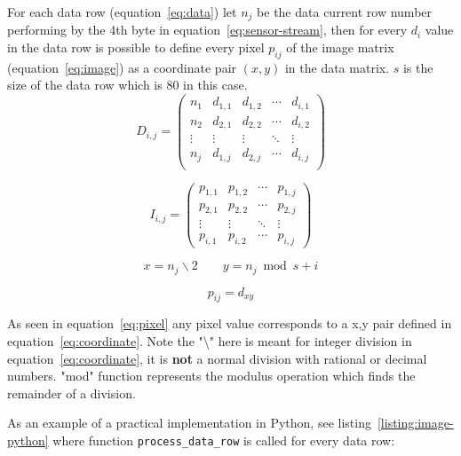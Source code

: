 \documentclass[hidelinks,11pt,a4paper,oneside,article]{memoir}
\begin{document}
For each data row (equation~\ref{eq:data}) let $n_j$ be the data current row number performing by the 4th byte in equation~\ref{eq:sensor-stream}, then for every $d_i$ value in the data row is possible to define every pixel $p_{ij}$ of the image matrix (equation~\ref{eq:image}) as a coordinate pair $(x,y)$ in the data matrix. $s$ is the size of the data row which is 80 in this case.
\begin{equation}
\label{eq:data}
D_{i,j} = 
\begin{pmatrix}
    n_1 & d_{1,1} & d_{1,2} & \cdots & d_{i,1}\\
    n_2 & d_{2,1} & d_{2,2} & \cdots & d_{i,2}\\
 \vdots & \vdots  & \vdots  & \ddots & \vdots  \\
    n_j & d_{1,j} & d_{2,j} & \cdots & d_{i,j}\\
\end{pmatrix}
\end{equation}

\begin{equation}
\label{eq:image}
I_{i,j} = 
\begin{pmatrix}
    p_{1,1} & p_{1,2} & \cdots & p_{1,j} \\
    p_{2,1} & p_{2,2} & \cdots & p_{2,j} \\
    \vdots  & \vdots  & \ddots & \vdots  \\
    p_{i,1} & p_{i,2} & \cdots & p_{i,j} 
\end{pmatrix}
\end{equation}

\begin{equation}
\label{eq:coordinate}
x = n_j \backslash 2  \qquad y = n_j \bmod s + i
\end{equation}

\begin{equation}
\label{eq:pixel}
p_{ij} = d_{xy}
\end{equation}

As seen in equation~\ref{eq:pixel} any pixel value corresponds to a x,y pair defined in equation~\ref{eq:coordinate}. Note the "\textbackslash" here is meant for integer division in equation~\ref{eq:coordinate}, it is \textbf{not} a normal division with rational or decimal numbers. "mod" function represents the modulus operation which finds the remainder of a division.

As an example of a practical implementation in Python, see listing~\ref{listing:image-python} where function \texttt{process{\_}data{\_}row} is called for every data row:
\end{document}
